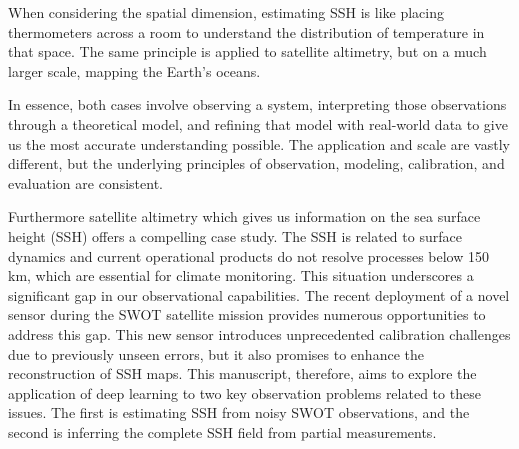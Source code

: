 \begin{bibunit}
When considering the spatial dimension, estimating SSH is like placing thermometers across a room to understand the distribution of temperature in that space. The same principle is applied to satellite altimetry, but on a much larger scale, mapping the Earth's oceans.

In essence, both cases involve observing a system, interpreting those observations through a theoretical model, and refining that model with real-world data to give us the most accurate understanding possible. The application and scale are vastly different, but the underlying principles of observation, modeling, calibration, and evaluation are consistent.

  Furthermore satellite altimetry which gives us information on the sea surface height (SSH) offers a compelling case study.
  The SSH is related to surface dynamics and current operational products do not resolve processes below 150 km, which are essential for climate monitoring.
  This situation underscores a significant gap in our observational capabilities.
  The recent deployment of a novel sensor during the SWOT satellite mission provides numerous opportunities to address this gap.
  This new sensor introduces unprecedented calibration challenges due to previously unseen errors, but it also promises to enhance the reconstruction of SSH maps.
This manuscript, therefore, aims to explore the application of deep learning to two key observation problems related to these issues. The first is estimating SSH from noisy SWOT observations, and the second is inferring the complete SSH field from partial measurements.
  

\end{bibunit}
